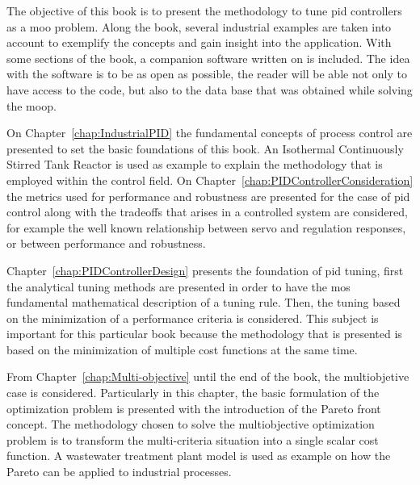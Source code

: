 The objective of this book is to present the methodology to tune \gls{pid} controllers as a \gls{moo} problem. Along the book, several industrial examples are taken into account to exemplify the concepts and gain insight into the application. With some sections of the book, a companion software written on \matlab is included. The idea with the software is to be as open as possible, the reader will be able not only to have access to the code, but also to the data base that was obtained while solving the \gls{moop}.

On Chapter~\ref{chap:IndustrialPID} the fundamental concepts of process control are presented to set the basic foundations of this book. An Isothermal Continuously Stirred Tank Reactor is used as example to explain the methodology that is employed within the control field. On Chapter~\ref{chap:PIDControllerConsideration} the metrics used for performance and robustness are presented for the case of \gls{pid} control along with the tradeoffs that arises in a controlled system are considered, for example the well known relationship between servo and regulation responses, or between performance and robustness.

Chapter~\ref{chap:PIDControllerDesign} presents the foundation of \gls{pid} tuning, first the analytical tuning methods are presented in order to have the mos fundamental mathematical description of a tuning rule. Then, the tuning based on the minimization of a performance criteria is considered. This subject is important for this particular book because the methodology that is presented is based on the minimization of multiple cost functions at the same time.

From Chapter~\ref{chap:Multi-objective} until the end of the book, the multiobjetive case is considered. Particularly in this chapter, the basic formulation of the optimization problem is presented with the introduction of the Pareto front concept. The methodology chosen to solve the multiobjective optimization problem is to transform the multi-criteria situation into a single scalar cost function. A wastewater treatment plant model is used as example on how the Pareto can be applied to industrial processes.

